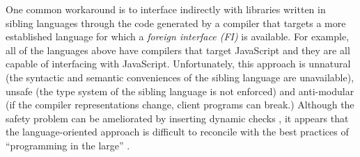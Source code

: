 \documentclass[preprint,10pt]{sigplanconf}
\begin{document}
One common workaround is to interface indirectly with libraries written in sibling languages through the code generated by a compiler that targets a more established language for which a \emph{foreign interface (FI)} is available. For example, all of the languages above have compilers that target JavaScript and they are all capable of interfacing with JavaScript. Unfortunately, this approach is unnatural (the syntactic and semantic conveniences of the sibling language are unavailable), unsafe (the type system of the sibling language is not enforced) and anti-modular (if the compiler representations change, client programs can break.) Although the safety problem can be ameliorated by inserting dynamic checks \cite{DBLP:journals/toplas/MatthewsF09}, it appears that the language-oriented approach \cite{journals/stp/Ward94} is difficult to reconcile with the best practices of ``programming in the large'' \cite{DeRemer76}. 



\end{document}
